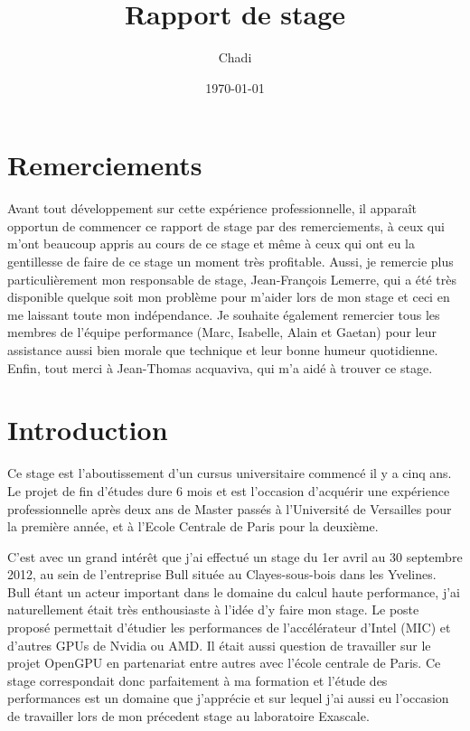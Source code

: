 \documentclass[11pt]{article}
\title{Rapport de stage}
\author{Chadi \bsc{AKEL}}
\date{\today}
\begin{document}
\pagestyle{fancy}
\lhead{\thepart}
\chead{}
\lfoot{}
\cfoot{\thepage}
\rfoot{}
\maketitle
\newpage
{}
\renewcommand{\contentsname}{Sommaire}
\tableofcontents

\newpage
{}
\part{Remerciements}
	Avant tout développement sur cette expérience professionnelle, il apparaît opportun de commencer ce rapport de stage par 
	des remerciements, à ceux qui m'ont beaucoup appris au cours de ce stage et même à ceux qui ont eu la gentillesse de faire 
	de ce stage un moment très profitable. Aussi, je remercie plus particulièrement mon responsable de stage, Jean-François Lemerre, 
	qui a été très disponible quelque soit mon problème pour m'aider lors de mon stage et ceci en me laissant toute mon 
	indépendance. \newline
	Je souhaite également remercier tous les membres de l'équipe performance (Marc, Isabelle, Alain et Gaetan) pour leur assistance 
	aussi bien morale que technique et leur bonne humeur quotidienne. \newline
	Enfin, tout merci à Jean-Thomas acquaviva, qui m'a aidé à trouver ce stage.

\newpage
{}
\part{Introduction}
	Ce stage est l'aboutissement d'un cursus universitaire commencé il y a cinq ans. Le projet de fin
	d'études dure 6 mois et est l'occasion d'acquérir une expérience professionnelle après deux ans
	de Master passés à l'Université de Versailles pour la première année, et à l'Ecole Centrale de Paris pour la deuxième. \newline

	C'est avec un grand intérêt que j’ai effectué un stage du 1er avril au 30 septembre 2012, au sein de l’entreprise Bull située au Clayes-sous-bois 
	dans les Yvelines. Bull étant un acteur important dans le domaine du calcul haute performance, j'ai naturellement 
	était très enthousiaste à l'idée d'y faire mon stage. Le poste proposé permettait d'étudier les performances de 
	l'accélérateur d'Intel (MIC) et d'autres GPUs de Nvidia ou AMD. Il était aussi question de travailler sur le projet 
	OpenGPU en partenariat entre autres avec l'école centrale de Paris. Ce stage correspondait donc parfaitement à ma formation et 
	l'étude des performances est un domaine que j'apprécie et sur lequel j'ai aussi eu l'occasion de travailler lors de 
	mon précedent stage au laboratoire Exascale. \newline
	
\end{document}
